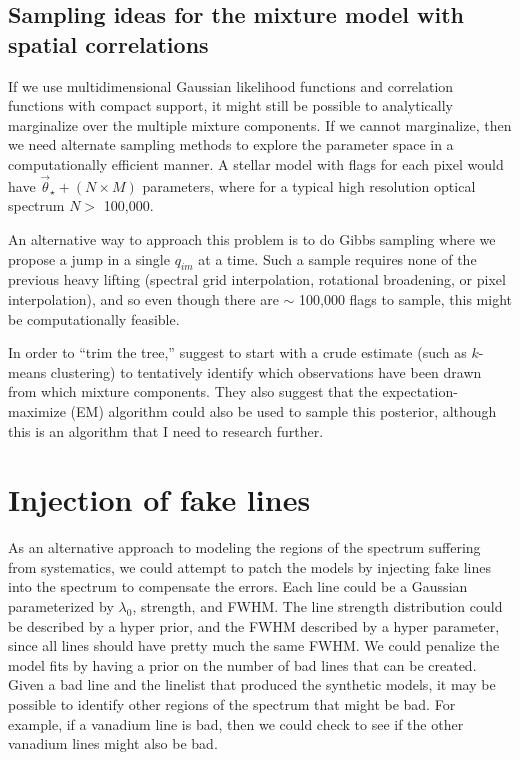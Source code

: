\documentclass[preprint]{aastex} %
\newcommand{\vt}{\vec{\theta}}
\newcommand{\vstar}{\vt_{\star}}
\begin{document}
\subsection{Sampling ideas for the mixture model with spatial correlations}
If we use multidimensional Gaussian likelihood functions and correlation functions with compact support, it might still be possible to analytically marginalize over the multiple mixture components. If we cannot marginalize, then we need alternate sampling methods to explore the parameter space in a computationally efficient manner. A stellar model with flags for each pixel would have $\vstar + (N \times M)$ parameters, where for a typical high resolution optical spectrum $N >$ 100,000. 

An alternative way to approach this problem is to do Gibbs sampling where we propose a jump in a single $q_{im}$ at a time. Such a sample requires none of the previous heavy lifting (spectral grid interpolation, rotational broadening, or pixel interpolation), and so even though there are $\sim$ 100,000 flags to sample, this might be computationally feasible.

In order to ``trim the tree,'' \citet{gcs+04} suggest to start with a crude estimate (such as $k$-means clustering) to tentatively identify which observations have been drawn from which mixture components. They also suggest that the expectation-maximize (EM) algorithm could also be used to sample this posterior, although this is an algorithm that I need to research further.

\section{Injection of fake lines}
As an alternative approach to modeling the regions of the spectrum suffering from systematics, we could attempt to patch the models by injecting fake lines into the spectrum to compensate the errors. Each line could be a Gaussian parameterized by $\lambda_0$, strength, and FWHM. The line strength distribution could be described by a hyper prior, and the FWHM described by a hyper parameter, since all lines should have pretty much the same FWHM. We could penalize the model fits by having a prior on the number of bad lines that can be created. Given a bad line and the linelist that produced the synthetic models, it may be possible to identify other regions of the spectrum that might be bad. For example, if a vanadium line is bad, then we could check to see if the other vanadium lines might also be bad. 
\end{document}
